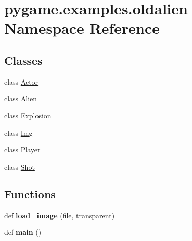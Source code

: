 \hypertarget{namespacepygame_1_1examples_1_1oldalien}{}\section{pygame.\+examples.\+oldalien Namespace Reference}
\label{namespacepygame_1_1examples_1_1oldalien}
\subsection*{Classes}
\begin{DoxyCompactItemize}
\item 
class \hyperlink{classpygame_1_1examples_1_1oldalien_1_1_actor}{Actor}
\item 
class \hyperlink{classpygame_1_1examples_1_1oldalien_1_1_alien}{Alien}
\item 
class \hyperlink{classpygame_1_1examples_1_1oldalien_1_1_explosion}{Explosion}
\item 
class \hyperlink{classpygame_1_1examples_1_1oldalien_1_1_img}{Img}
\item 
class \hyperlink{classpygame_1_1examples_1_1oldalien_1_1_player}{Player}
\item 
class \hyperlink{classpygame_1_1examples_1_1oldalien_1_1_shot}{Shot}
\end{DoxyCompactItemize}
\subsection*{Functions}
\begin{DoxyCompactItemize}
\item 
\mbox{\label{namespacepygame_1_1examples_1_1oldalien_a3ca28affe2390daa4071af03ff8e0667}} 
def {\bfseries load\+\_\+image} (file, transparent)
\item 
\mbox{\label{namespacepygame_1_1examples_1_1oldalien_a719a778a907c96e1da2c8783d62ea84c}} 
def {\bfseries main} ()
\end{DoxyCompactItemize}
